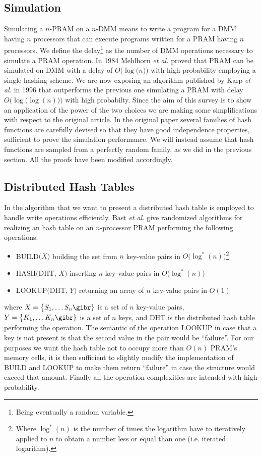 \subsection{Simulation}
Simulating a $n$-PRAM on a $n$-DMM means to write a program for a DMM having
$n$ processors that can execute programs written for a PRAM having
$n$ processors. We define the delay\footnote{Being eventually
  a random variable.} as the number of DMM operations necessary to simulate
a PRAM operation. In 1984 Mehlhorn {\em et al.} \cite{art} proved that PRAM
can be simulated on DMM with a delay of $O\bigl(\log\bigl(n\bigr)\bigr)$
 with high probability employing a single hashing scheme. 
We are now exposing an algorithm published by Karp {\em et al.} \cite{Karp} in
1996 that
outperforms the previous one simulating a PRAM with delay
$O\bigl(\log\bigl(\log(n)\bigr)\bigr)$ with high probabilty.
Since the aim of this survey is to show an application of the power of the two
choices we are making some simplifications with respect to the original article.
In the original paper several families of hash
functions are carefully
devised so that they have good independence properties,
sufficient to prove the simulation 
performance. We will instead assume that hash functions are sampled from
a perfectly random family, as we did in the previous section. All the proofs
have been modified accordingly.

\subsection{Distributed Hash Tables}
In the algorithm that we want to present a distributed hash
table is employed to handle write operations efficiently.
Bast {\em et al.} \cite{Bast}
give randomized algorithms for realizing an hash table on an $n$-processor PRAM
performing the following operations:
\begin{itemize}
\item BUILD$\bigl(X\bigr)$ building the set from $n$ key-value
  pairs in $O\bigl(\log^*(n)\bigr)$\footnote{Where $\log^*(n)$ is the number of
    times the logarithm have to iteratively applied to $n$ to obtain a number
    less or equal than one (i.e. iterated logarithm).}
\item HASH$\bigl(\text{DHT, }X\bigr)$ inserting $n$ key-value pairs in  
  $O\bigl(\log^*(n)\bigr)$
\item LOOKUP$\bigl(\text{DHT, }Y\bigr)$ returning an array of $n$ key-value pairs in $O(1)$
\end{itemize}
where $X = \bigl\{S_1, \dots S_n\gibr\}$ is a set of $n$ key-value pairs,
$Y = \bigl\{K_1, \dots K_n\gibr\}$ is a set of $n$ keys, and DHT is the
distributed hash table performing the operation.
The semantic of the operation LOOKUP in case that a key is not present is that
the second value in the pair would be ``failure''. For our purposes we want
the hash table not to occupy more than $O(n)$ PRAM's memory cells, it is
then sufficient to slightly modify the implementation of BUILD and LOOKUP
to make them return ``failure'' in case the structure would exceed that amount.
Finally all the operation complexities are intended with high probability.

